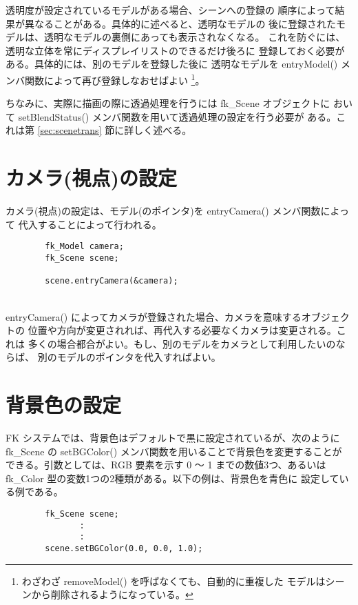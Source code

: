 透明度が設定されているモデルがある場合、シーンへの登録の
順序によって結果が異なることがある。具体的に述べると、透明なモデルの
後に登録されたモデルは、透明なモデルの裏側にあっても表示されなくなる。
これを防ぐには、透明な立体を常にディスプレイリストのできるだけ後ろに
登録しておく必要がある。具体的には、別のモデルを登録した後に
透明なモデルを entryModel() メンバ関数によって再び登録しなおせばよい
\footnote{わざわざ removeModel() を呼ばなくても、自動的に重複した
モデルはシーンから削除されるようになっている。}。

ちなみに、実際に描画の際に透過処理を行うには fk\_Scene オブジェクトに
おいて setBlendStatus() メンバ関数を用いて透過処理の設定を行う必要が
ある。これは第 \ref{sec:scenetrans} 節に詳しく述べる。

\section{カメラ(視点)の設定} \label{sec:scenecamera}
カメラ(視点)の設定は、モデル(のポインタ)を entryCamera() メンバ関数によって
代入することによって行われる。
\\
\begin{breakbox}
\begin{verbatim}
        fk_Model camera;
        fk_Scene scene;

        scene.entryCamera(&camera);
\end{verbatim}
\end{breakbox}
~ \\
entryCamera() によってカメラが登録された場合、カメラを意味するオブジェクトの
位置や方向が変更されれば、再代入する必要なくカメラは変更される。これは
多くの場合都合がよい。もし、別のモデルをカメラとして利用したいのならば、
別のモデルのポインタを代入すればよい。

\section{背景色の設定} \label{sec:scenebg}
FK システムでは、背景色はデフォルトで黒に設定されているが、次のように
fk\_Scene の setBGColor() メンバ関数を用いることで背景色を変更することが
できる。引数としては、RGB 要素を示す 0 〜 1 までの数値3つ、あるいは
fk\_Color 型の変数1つの2種類がある。以下の例は、背景色を青色に
設定している例である。
\\
\begin{breakbox}
\begin{verbatim}
        fk_Scene scene;
               :
               :
        scene.setBGColor(0.0, 0.0, 1.0);
\end{verbatim}
\end{breakbox}

